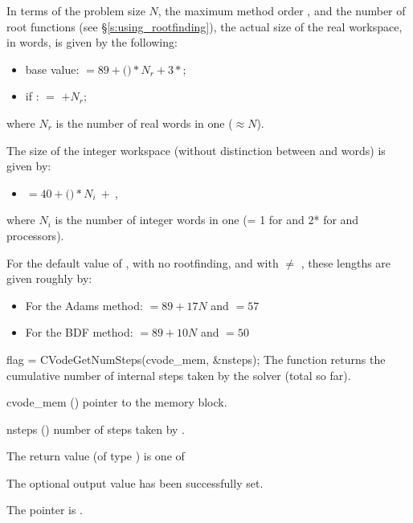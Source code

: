 {
  In terms of the problem size $N$, the maximum method order , and
  the number  of root functions (see \S\ref{s:using_rootfinding}),
  the actual size of the real workspace, in  words, is
  given by the following:
  \begin{itemize}
  \item base value:  $= 89 + ($$)*N_r + 3*$;
  \item if :  $=$  $+ N_r$;
  \end{itemize}
  where $N_r$ is the number of real words in one  ($\approx N$).

  The size of the integer workspace (without distinction between  
  and  words) is given by:
  \begin{itemize}
  \item {} $= 40 + ($$)*N_i ~ + ~ $,  
  \end{itemize}
  where $N_i$ is the number of integer words in one 
  (= 1 for {\nvecs} and 2* for {\nvecp} and  processors).

  For the default value of , with no rootfinding, and with
   $\neq$ , these lengths are given roughly by:
  \begin{itemize}
  \item For the Adams method:  $= 89 + 17N$ and  $= 57$ 
  \item For the BDF method:  $= 89 + 10N$ and  $= 50$ 
  \end{itemize}
}
{
  flag = CVodeGetNumSteps(cvode\_mem, \&nsteps);
}
{
  The function  returns the cumulative number of internal 
  steps taken by the solver (total so far).
}
{
  \begin{args}
  \item[cvode\_mem] ()
    pointer to the {\cvode} memory block.
  \item[nsteps] ()
    number of steps taken by {\cvode}.
  \end{args}
}
{
  The return value  (of type ) is one of
  \begin{args}
  \item[\Id{CV\_SUCCESS}] 
    The optional output value has been successfully set.
  \item[\Id{CV\_MEM\_NULL}]
    The  pointer is .
  \end{args}
}
